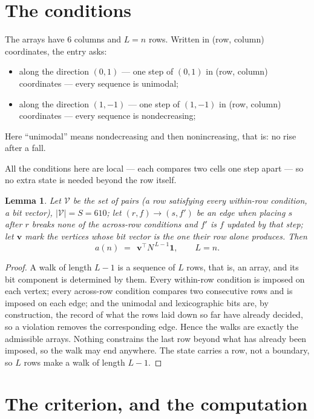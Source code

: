 \documentclass[11pt,a4paper]{article}
\theoremstyle{plain}
\newtheorem{lemma}[theorem]{Lemma}
\theoremstyle{definition}
\begin{document}
\section{The conditions}

The arrays have $6$ columns and $L=n$ rows. Written in (row, column)
coordinates, the entry asks:
\begin{itemize}
\item along the direction $(0,1)$ --- one step of $(0,1)$ in (row, column) coordinates --- every sequence is unimodal;
\item along the direction $(1,-1)$ --- one step of $(1,-1)$ in (row, column) coordinates --- every sequence is nondecreasing;
\end{itemize}
Here ``unimodal'' means nondecreasing and then nonincreasing, that is: no rise after a fall.

All the conditions here are local --- each compares two cells one step apart ---
so no extra state is needed beyond the row itself.

\begin{lemma}\label{lem:walk}
Let $\mathcal V$ be the set of pairs (a row satisfying every within-row condition, a
bit vector), $|\mathcal V|=S=610$; let $(r,f)\to(s,f')$ be an edge when placing $s$ after $r$
breaks none of the across-row conditions and $f'$ is $f$ updated by that step; let
$\mathbf{v}$ mark the vertices whose bit vector is the one their row alone produces.
Then
\[
a(n)\;=\;\,\mathbf{v}^{\!\top}N^{\,L-1}\mathbf{1},\qquad L=n.
\]
\end{lemma}

\begin{proof}
A walk of length $L-1$ is a sequence of $L$ rows, that is, an array, and its bit component
is determined by them. Every within-row condition is imposed on each vertex; every
across-row condition compares two consecutive rows and is imposed on each edge; and the
unimodal and lexicographic bits are, by construction, the record of what the rows laid down
so far have already decided, so a violation removes the corresponding edge. Hence the walks
are exactly the admissible arrays. Nothing constrains the last row beyond what has already
been imposed, so the walk may end anywhere. The state carries a row, not a boundary, so
$L$ rows make a walk of length $L-1$.
\end{proof}

\section{The criterion, and the computation}
\end{document}
